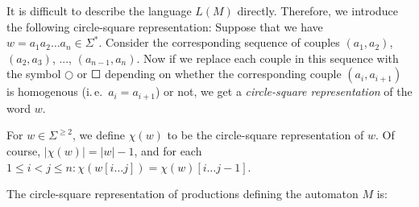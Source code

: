 It is difficult to describe the language $L(M)$ directly. Therefore, we introduce the following circle-square representation: Suppose that we have $w = a_1 a_2 \ldots a_n \in \Sigma^*$. Consider the corresponding sequence of couples $(a_1, a_2)$, $(a_2, a_3)$, ..., $(a_{n-1}, a_n)$. Now if we replace each couple in this sequence with the symbol $\Circle$ or $\Square$ depending on whether the corresponding couple $(a_i, a_{i+1})$ is homogenous (i.\,e.\ $a_i = a_{i+1}$) or not, we get a \emph{circle-square representation} of the word $w$.

For $w \in \Sigma^{\ge 2}$, we define $\chi(w)$ to be the circle-square representation of $w$. Of course, $|\chi(w)| = |w| - 1$, and for each $1 \le i < j \le n: \chi(w[i \ldots j]) = \chi(w)[i \ldots j - 1]$.

The circle-square representation of productions defining the automaton $M$ is:
